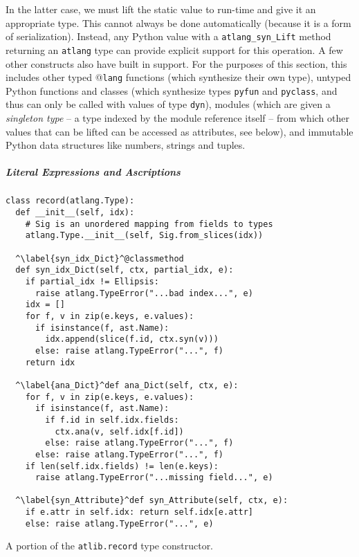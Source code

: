 \documentclass[9pt]{sigplanconf}
\newcommand{\lstinlinep}[1]{\lstinline[language=Python,basicstyle=\ttfamily\small,deletendkeywords={tuple,buffer,map}]{#1}}
\begin{document}
In the latter case, we must lift the static value to run-time and give it an appropriate type. This cannot always be done automatically (because it is a form of serialization). Instead, any Python value with a \lstinlinep{atlang_syn_Lift} method returning an \lstinlinep{atlang} type can provide explicit support for this operation. A few other constructs also have built in support. For the purposes of this section, this includes other typed @\texttt{lang} functions (which synthesize their own type), untyped Python functions and classes (which synthesize types \lstinlinep{pyfun} and \lstinlinep{pyclass}, and thus can only be called with values of type \lstinlinep{dyn}), modules (which are given a \emph{singleton type} -- a type indexed by the module reference itself -- from which other values that can be lifted can be accessed as attributes, see below), and immutable Python data structures like numbers, strings and tuples. %
\subparagraph{Literal Expressions and Ascriptions}
\begin{codelisting}[t]
\begin{lstlisting}
class record(atlang.Type):
  def __init__(self, idx): 
    # Sig is an unordered mapping from fields to types
    atlang.Type.__init__(self, Sig.from_slices(idx))
    
  ^\label{syn_idx_Dict}^@classmethod
  def syn_idx_Dict(self, ctx, partial_idx, e):
    if partial_idx != Ellipsis: 
      raise atlang.TypeError("...bad index...", e)
    idx = []
    for f, v in zip(e.keys, e.values):
      if isinstance(f, ast.Name): 
        idx.append(slice(f.id, ctx.syn(v)))
      else: raise atlang.TypeError("...", f)
    return idx
    
  ^\label{ana_Dict}^def ana_Dict(self, ctx, e):
    for f, v in zip(e.keys, e.values):
      if isinstance(f, ast.Name):
        if f.id in self.idx.fields: 
          ctx.ana(v, self.idx[f.id])
        else: raise atlang.TypeError("...", f)
      else: raise atlang.TypeError("...", f)
    if len(self.idx.fields) != len(e.keys): 
      raise atlang.TypeError("...missing field...", e)

  ^\label{syn_Attribute}^def syn_Attribute(self, ctx, e):
    if e.attr in self.idx: return self.idx[e.attr]
    else: raise atlang.TypeError("...", e)
\end{lstlisting}
%
\caption{A portion of the \texttt{atlib.record} type constructor.}
\label{record}
\end{codelisting}
\end{document}
